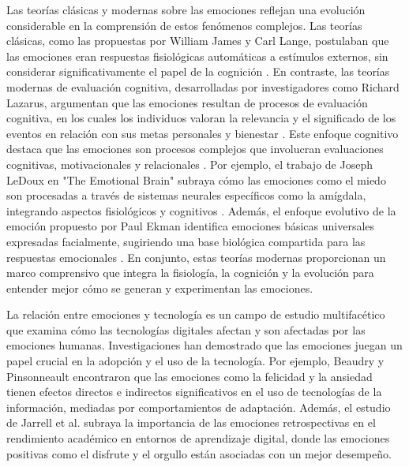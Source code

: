 Las teorías clásicas y modernas sobre las emociones reflejan una evolución considerable en la comprensión de estos fenómenos complejos. Las teorías clásicas, como las propuestas por William James y Carl Lange, postulaban que las emociones eran respuestas fisiológicas automáticas a estímulos externos, sin considerar significativamente el papel de la cognición \cite{james_what_1948, lange_emotions_1922}. En contraste, las teorías modernas de evaluación cognitiva, desarrolladas por investigadores como Richard Lazarus, argumentan que las emociones resultan de procesos de evaluación cognitiva, en los cuales los individuos valoran la relevancia y el significado de los eventos en relación con sus metas personales y bienestar \cite{lazarus_emotion_1991}. Este enfoque cognitivo destaca que las emociones son procesos complejos que involucran evaluaciones cognitivas, motivacionales y relacionales \cite{ellsworth_implications_1991}. Por ejemplo, el trabajo de Joseph LeDoux en "The Emotional Brain" subraya cómo las emociones como el miedo son procesadas a través de sistemas neurales específicos como la amígdala, integrando aspectos fisiológicos y cognitivos \cite{ledoux_emotional_1998}. Además, el enfoque evolutivo de la emoción propuesto por Paul Ekman identifica emociones básicas universales expresadas facialmente, sugiriendo una base biológica compartida para las respuestas emocionales \cite{ekman_emotion_1972}. En conjunto, estas teorías modernas proporcionan un marco comprensivo que integra la fisiología, la cognición y la evolución para entender mejor cómo se generan y experimentan las emociones.

La relación entre emociones y tecnología es un campo de estudio multifacético que examina cómo las tecnologías digitales afectan y son afectadas por las emociones humanas. Investigaciones han demostrado que las emociones juegan un papel crucial en la adopción y el uso de la tecnología. Por ejemplo, Beaudry y Pinsonneault \citeyear{beaudry_other_2010} encontraron que las emociones como la felicidad y la ansiedad tienen efectos directos e indirectos significativos en el uso de tecnologías de la información, mediadas por comportamientos de adaptación. Además, el estudio de Jarrell et al. \citeyear{jarrell_success_2017} subraya la importancia de las emociones retrospectivas en el rendimiento académico en entornos de aprendizaje digital, donde las emociones positivas como el disfrute y el orgullo están asociadas con un mejor desempeño.

